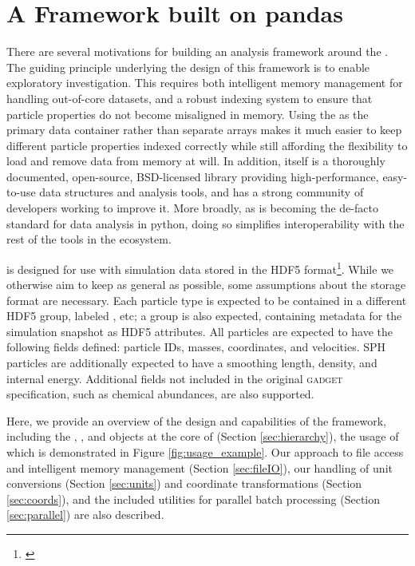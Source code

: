 \section{A Framework built on pandas}
\label{sec:framework}

There are several motivations for building an analysis framework around the . 
The guiding principle underlying the design of this framework is to enable exploratory investigation.
This requires both intelligent memory management for handling out-of-core datasets, and a robust indexing system to ensure that particle properties do not become misaligned in memory.
Using  the  as the primary data container rather than separate  arrays makes it much easier to keep different particle properties indexed correctly while still affording the flexibility to load and remove data from memory at will.
In addition,  itself is a thoroughly documented, open-source, BSD-licensed library providing high-performance, easy-to-use data structures and analysis tools, and has a strong community of developers working to improve it.  
More broadly, as  is becoming the de-facto standard for data analysis in python, doing so simplifies interoperability with the rest of the tools in the ecosystem.

 is designed for use with simulation data stored in the HDF5 format\footnote{\citep{hdf5}}.  
While we otherwise aim to keep  as general as possible, some assumptions about the storage format are necessary.
Each particle type is expected to be contained in a different HDF5 group, labeled , etc; a  group is also expected, containing metadata for the simulation snapshot as HDF5 attributes. 
All particles are expected to have the following fields defined: particle IDs, masses, coordinates, and velocities.  
SPH particles are additionally expected to have a smoothing length, density, and internal energy.  Additional fields not included in the original \textsc{gadget} specification, such as chemical abundances, are also supported.

Here, we provide an overview of the design and capabilities of the  framework, including the , , and  objects at the core of  (Section \ref{sec:hierarchy}), the usage of which is demonstrated in Figure \ref{fig:usage_example}.
Our approach to file access and intelligent memory management (Section \ref{sec:fileIO}), our handling of unit conversions (Section \ref{sec:units}) and coordinate transformations (Section \ref{sec:coords}), and the included utilities for parallel batch processing (Section \ref{sec:parallel}) are also described.
